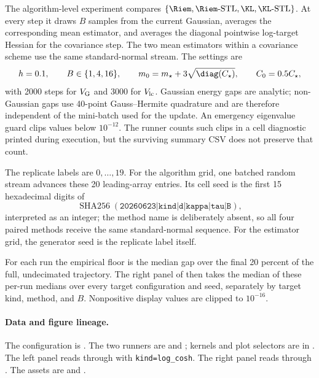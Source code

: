 The algorithm-level experiment compares
\(\{\Riem,\Riem\text{-STL},\KL,\KL\text{-STL}\}\).  At every step it draws
\(B\) samples from the current Gaussian, averages the corresponding mean
estimator, and averages the diagonal pointwise log-target Hessian for the
covariance step.  The two mean estimators within a covariance scheme use the
same standard-normal stream.  The settings are
\[
  h=0.1,\qquad B\in\{1,4,16\},\qquad
  m_0=m_\star+3\sqrt{\diag(C_\star)},\qquad C_0=0.5C_\star,
\]
with 2000 steps for \(V_{\rm G}\) and 3000 for \(V_{\rm lc}\).  Gaussian
energy gaps are analytic; non-Gaussian gaps use 40-point Gauss--Hermite
quadrature and are therefore independent of the mini-batch used for the
update.  An emergency eigenvalue guard clips values below \(10^{-12}\).  The
runner counts such clips in a cell diagnostic printed during execution, but the
surviving summary CSV does not preserve that count.

The replicate labels are \(0,\ldots,19\).  For the algorithm grid, one
batched random stream advances these 20 leading-array entries.  Its cell seed
is the first 15 hexadecimal digits of
\[
  \operatorname{SHA256}(
  \texttt{20260623|kind|d|kappa|tau|B}),
\]
interpreted as an integer; the method name is deliberately absent, so all four
paired methods receive the same standard-normal sequence.  For the estimator
grid, the generator seed is the replicate label itself.

For each run the empirical floor is the median gap over the final 20 percent
of the full, undecimated trajectory.  The right panel of 
then takes the median of these per-run medians over every target configuration
and seed, separately by target kind, method, and \(B\).  Nonpositive display
values are clipped to \(10^{-16}\).

\paragraph{Data and figure lineage.}
\begingroup\small\raggedright
The configuration is
.  The two
runners are
 and
; kernels and
plot selectors are in .  The left panel
reads  through
 with
\texttt{kind=log\_cosh}.  The right panel reads
 through
.  The assets are
 and
.
\par\endgroup

